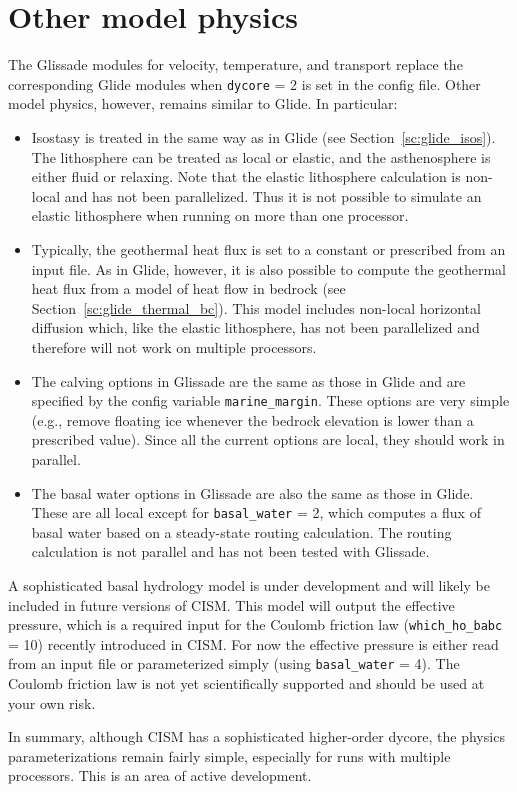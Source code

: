 
\section{Other model physics}
\label{glissade-physics}
The Glissade modules for velocity, temperature, and transport replace the
corresponding Glide modules when \texttt{dycore} = 2 is set in the config file.
Other model physics, however, remains similar to Glide.  In particular:

\begin{itemize}

\item Isostasy is treated in the same way as in Glide (see Section~\ref{sc:glide_isos}).
The lithosphere can be treated as local or elastic, and the asthenosphere is
either fluid or relaxing.  Note that the elastic lithosphere calculation
is non-local and has not been parallelized.  Thus it is not possible to simulate
an elastic lithosphere when running on more than one processor.

\item Typically, the geothermal heat flux is set to a constant or prescribed from
an input file.  As in Glide, however, it is also possible to compute the
geothermal heat flux from a model of heat flow in bedrock (see Section~\ref{sc:glide_thermal_bc}).
This model includes non-local horizontal diffusion which, like the elastic
lithosphere, has not been parallelized and therefore will not work on multiple
processors.

\item The calving options in Glissade are the same as those in Glide and
are specified by the config variable \texttt{marine\_margin}.
These options are very simple (e.g., remove floating ice whenever the bedrock
elevation is lower than a prescribed value).  Since all the current options are local,
they should work in parallel.

\item The basal water options in Glissade are also the same as those in Glide.
These are all local except for \texttt{basal\_water} = 2, which computes a flux
of basal water based on a steady-state routing calculation.  The routing calculation
is not parallel and has not been tested with Glissade.

\end{itemize}

A sophisticated basal hydrology model is under development and will likely be
included in future versions of CISM.  This model will output the effective pressure,
which is a required input for the Coulomb friction law
(\texttt{which\_ho\_babc} = 10) recently introduced in CISM.
For now the effective pressure is either read from an input file
or parameterized simply (using \texttt{basal\_water} = 4).
The Coulomb friction law is not yet scientifically supported and
should be used at your own risk.

In summary, although CISM has a sophisticated higher-order dycore,
the physics parameterizations remain fairly simple, especially for runs
with multiple processors.  This is an area of active development.

